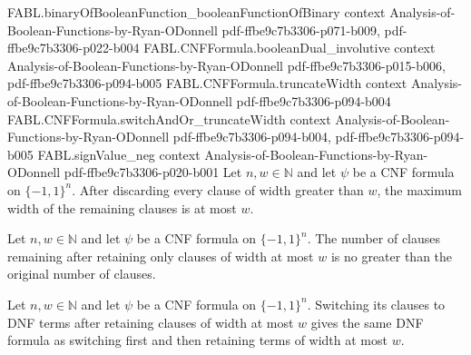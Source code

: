 \begin{theorem}
  {FABL.binaryOfBooleanFunction_booleanFunctionOfBinary}
  {context}
  {Analysis-of-Boolean-Functions-by-Ryan-ODonnell}
  {pdf-ffbe9c7b3306-p071-b009,
    pdf-ffbe9c7b3306-p022-b004}
\proofstep
  {FABL.CNFFormula.booleanDual_involutive}
  {context}
  {Analysis-of-Boolean-Functions-by-Ryan-ODonnell}
  {pdf-ffbe9c7b3306-p015-b006,
    pdf-ffbe9c7b3306-p094-b005}
\proofstep
  {FABL.CNFFormula.truncateWidth}
  {context}
  {Analysis-of-Boolean-Functions-by-Ryan-ODonnell}
  {pdf-ffbe9c7b3306-p094-b004}
\proofstep
  {FABL.CNFFormula.switchAndOr_truncateWidth}
  {context}
  {Analysis-of-Boolean-Functions-by-Ryan-ODonnell}
  {pdf-ffbe9c7b3306-p094-b004,
    pdf-ffbe9c7b3306-p094-b005}
\proofstep
  {FABL.signValue_neg}
  {context}
  {Analysis-of-Boolean-Functions-by-Ryan-ODonnell}
  {pdf-ffbe9c7b3306-p020-b001}
Let $n,w\in\mathbb{N}$ and let $\psi$ be a CNF formula on $\{-1,1\}^n$. After discarding
every clause of width greater than $w$, the maximum width of the remaining clauses is at
most $w$.
\end{theorem}

\begin{theorem}
\label{FABL.CNFFormula.size_truncateWidth_le}
\leanok
{}
Let $n,w\in\mathbb{N}$ and let $\psi$ be a CNF formula on $\{-1,1\}^n$. The number of
clauses remaining after retaining only clauses of width at most $w$ is no greater than
the original number of clauses.
\end{theorem}

\begin{theorem}
\label{FABL.CNFFormula.switchAndOr_truncateWidth}
\leanok
{}
Let $n,w\in\mathbb{N}$ and let $\psi$ be a CNF formula on $\{-1,1\}^n$. Switching its
clauses to DNF terms after retaining clauses of width at most $w$ gives the same DNF
formula as switching first and then retaining terms of width at most $w$.
\end{theorem}

